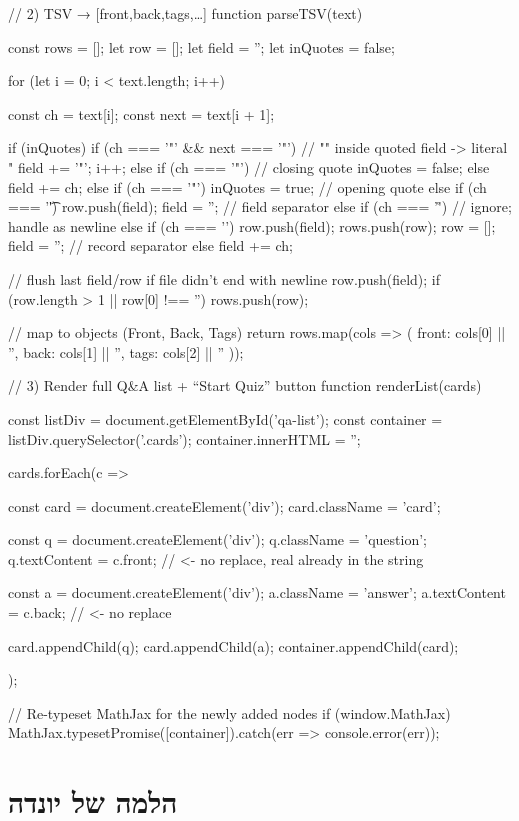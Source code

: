 \documentclass{tstextbook}
\begin{document}
    // 2) TSV → [{front,back,tags},…]
    function parseTSV(text) {
  const rows = [];
  let row = [];
  let field = '';
  let inQuotes = false;

  for (let i = 0; i < text.length; i++) {
    const ch = text[i];
    const next = text[i + 1];

    if (inQuotes) {
      if (ch === '"' && next === '"') {
        // "" inside quoted field -> literal "
        field += '"';
        i++;
      } else if (ch === '"') {
        // closing quote
        inQuotes = false;
      } else {
        field += ch;
      }
    } else {
      if (ch === '"') {
        inQuotes = true;                // opening quote
      } else if (ch === '\t') {
        row.push(field); field = '';    // field separator
      } else if (ch === '\r') {
        // ignore; handle \n as newline
      } else if (ch === '\n') {
        row.push(field); rows.push(row);
        row = []; field = '';           // record separator
      } else {
        field += ch;
      }
    }
  }
  // flush last field/row if file didn't end with newline
  row.push(field);
  if (row.length > 1 || row[0] !== '') rows.push(row);

  // map to objects (Front, Back, Tags)
  return rows.map(cols => ({
    front: cols[0] || '',
    back:  cols[1] || '',
    tags:  cols[2] || ''
  }));
}
// 3) Render full Q&A list + “Start Quiz” button
function renderList(cards) {
  const listDiv = document.getElementById('qa-list');
  const container = listDiv.querySelector('.cards');
  container.innerHTML = '';

  cards.forEach(c => {
    const card = document.createElement('div');
    card.className = 'card';

    const q = document.createElement('div');
    q.className = 'question';
    q.textContent = c.front;   // <- no replace, real \n already in the string

    const a = document.createElement('div');
    a.className = 'answer';
    a.textContent = c.back;    // <- no replace

    card.appendChild(q);
    card.appendChild(a);
    container.appendChild(card);
  });

  // Re-typeset MathJax for the newly added nodes
  if (window.MathJax) {
    MathJax.typesetPromise([container]).catch(err => console.error(err));
  }
}
  \chapter{הלמה של יונדה}
\end{document}
